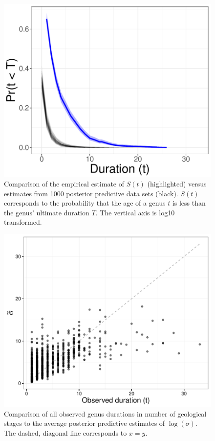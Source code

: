 \documentclass{article}
\begin{document}
\begin{figure}[ht]
  \centering
  \includegraphics[height = 0.5\textheight,width=\textwidth,keepaspectratio=true]{figure/survival_curves}
  \caption{Comparison of the empirical estimate of \(S(t)\) (highlighted) versus estimates from 1000 posterior predictive data sets (black). \(S(t)\) corresponds to the probability that the age of a genus \(t\) is less than the genus' ultimate duration \(T\). The vertical axis is log10 transformed.}
  \label{fig:surv}
\end{figure}


\begin{figure}[ht]
  \centering
  \includegraphics[height = 0.5\textheight,width=\textwidth,keepaspectratio=true]{figure/shotgun}
  \caption{Comparison of all observed genus durations in number of geological stages to the average posterior predictive estimates of \(\log(\sigma)\). The dashed, diagonal line corresponds to \(x = y\).}
  \label{fig:shot}
\end{figure}
\end{document}
